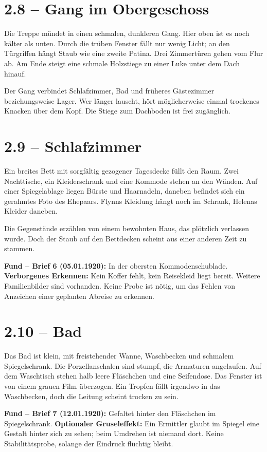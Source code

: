 \section{2.8 -- Gang im Obergeschoss}
\begin{vorlesetextalle}
Die Treppe mündet in einen schmalen, dunkleren Gang. Hier oben ist es noch kälter als unten. Durch die trüben Fenster fällt nur wenig Licht; an den Türgriffen hängt Staub wie eine zweite Patina. Drei Zimmertüren gehen vom Flur ab. Am Ende steigt eine schmale Holzstiege zu einer Luke unter dem Dach hinauf.
\end{vorlesetextalle}
\begin{meisterinfo}
Der Gang verbindet Schlafzimmer, Bad und früheres Gästezimmer beziehungsweise Lager. Wer länger lauscht, hört möglicherweise einmal trockenes Knacken über dem Kopf. Die Stiege zum Dachboden ist frei zugänglich.
\end{meisterinfo}

\section{2.9 -- Schlafzimmer}
\begin{vorlesetextalle}
Ein breites Bett mit sorgfältig gezogener Tagesdecke füllt den Raum. Zwei Nachttische, ein Kleiderschrank und eine Kommode stehen an den Wänden. Auf einer Spiegelablage liegen Bürste und Haarnadeln, daneben befindet sich ein gerahmtes Foto des Ehepaars. Flynns Kleidung hängt noch im Schrank, Helenas Kleider daneben.

Die Gegenstände erzählen von einem bewohnten Haus, das plötzlich verlassen wurde. Doch der Staub auf den Bettdecken scheint aus einer anderen Zeit zu stammen.
\end{vorlesetextalle}
\begin{meisterinfo}
\textbf{Fund -- Brief 6 (05.01.1920):} In der obersten Kommodenschublade. \textbf{Verborgenes Erkennen:} Kein Koffer fehlt, kein Reisekleid liegt bereit. Weitere Familienbilder sind vorhanden. Keine Probe ist nötig, um das Fehlen von Anzeichen einer geplanten Abreise zu erkennen.
\end{meisterinfo}

\section{2.10 -- Bad}
\begin{vorlesetextalle}
Das Bad ist klein, mit freistehender Wanne, Waschbecken und schmalem Spiegelschrank. Die Porzellanschalen sind stumpf, die Armaturen angelaufen. Auf dem Waschtisch stehen halb leere Fläschchen und eine Seifendose. Das Fenster ist von einem grauen Film überzogen. Ein Tropfen fällt irgendwo in das Waschbecken, doch die Leitung scheint trocken zu sein.
\end{vorlesetextalle}
\begin{meisterinfo}
\textbf{Fund -- Brief 7 (12.01.1920):} Gefaltet hinter den Fläschchen im Spiegelschrank. \textbf{Optionaler Gruseleffekt:} Ein Ermittler glaubt im Spiegel eine Gestalt hinter sich zu sehen; beim Umdrehen ist niemand dort. Keine Stabilitätsprobe, solange der Eindruck flüchtig bleibt.
\end{meisterinfo}

